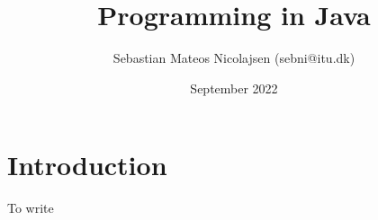\documentclass{article}
\title{Programming in Java}
\author{Sebastian Mateos Nicolajsen (sebni@itu.dk) }
\date{September 2022}
\begin{document}
\maketitle

\section{Introduction}
To write
\end{document}
